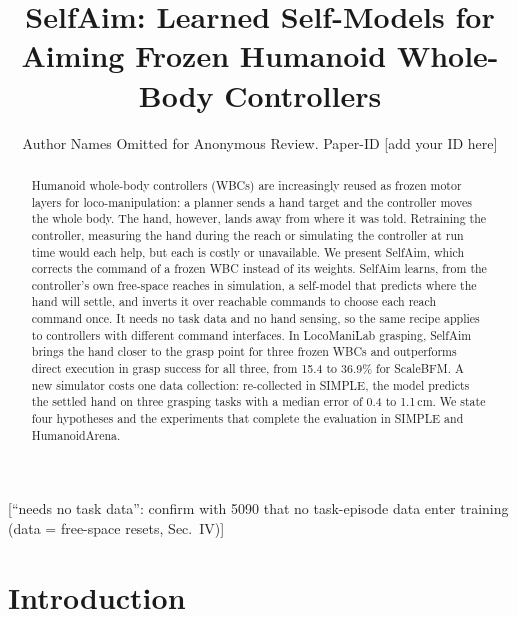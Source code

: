 \documentclass[conference]{IEEEtran}
\newif\ifdraft \drafttrue
\newcommand{\dnote}[1]{\ifdraft{\color{red}\footnotesize[#1]}\fi}
\begin{document}
\title{SelfAim: Learned Self-Models for Aiming Frozen Humanoid Whole-Body Controllers}

\author{Author Names Omitted for Anonymous Review. Paper-ID [add your ID here]}

\maketitle

\begin{abstract}
Humanoid whole-body controllers (WBCs) are increasingly reused as frozen motor layers for loco-manipulation: a planner sends a hand target and the controller moves the whole body. The hand, however, lands away from where it was told. Retraining the controller, measuring the hand during the reach or simulating the controller at run time would each help, but each is costly or unavailable. We present SelfAim, which corrects the command of a frozen WBC instead of its weights. SelfAim learns, from the controller's own free-space reaches in simulation, a self-model that predicts where the hand will settle, and inverts it over reachable commands to choose each reach command once. It needs no task data and no hand sensing, so the same recipe applies to controllers with different command interfaces. In LocoManiLab grasping, SelfAim brings the hand closer to the grasp point for three frozen WBCs and outperforms direct execution in grasp success for all three, from 15.4 to 36.9\% for ScaleBFM. A new simulator costs one data collection: re-collected in SIMPLE, the model predicts the settled hand on three grasping tasks with a median error of 0.4 to 1.1\,cm. We state four hypotheses and the experiments that complete the evaluation in SIMPLE and HumanoidArena.
\end{abstract}
\dnote{``needs no task data'': confirm with 5090 that no task-episode data enter training (data = free-space resets, Sec.~IV)}

\IEEEpeerreviewmaketitle

\section{Introduction}
\end{document}
